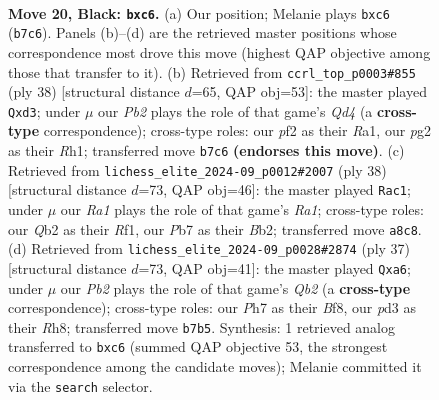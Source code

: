 \documentclass[11pt]{article}
\begin{document}
\clearpage

\begin{figure}[p]\centering
\begin{subfigure}{0.46\textwidth}\centering
\resizebox{\linewidth}{!}{%
\newchessgame
\chessboard[
  setfen={r6r/ppk2p1p/2N2N2/6Q1/3p4/3P4/bq3PPP/2R3K1 b - - 0 20},
  showmover=false,
  pgfstyle=straightmove, color=movearrow, markmove={b7-c6}
]}
\caption{}
\end{subfigure}\hfill
\begin{subfigure}{0.46\textwidth}\centering
\resizebox{\linewidth}{!}{%
\newchessgame
\chessboard[
  setfen={r3k3/pp3p2/6r1/1q5p/3Q3P/3nP3/PB2KPP1/R6R w q - 0 20},
  showmover=false,
  pgfstyle=straightmove, color=movearrow, markmove={d4-d3}
]}
\caption{}
\end{subfigure}
\\[4pt]
\begin{subfigure}{0.46\textwidth}\centering
\resizebox{\linewidth}{!}{%
\newchessgame
\chessboard[
  setfen={1rr5/p4ppp/4pk2/8/3q4/2n2P2/PBQ2P1P/R4RK1 w - - 4 20},
  showmover=false,
  pgfstyle=straightmove, color=movearrow, markmove={a1-c1}
]}
\caption{}
\end{subfigure}\hfill
\begin{subfigure}{0.46\textwidth}\centering
\resizebox{\linewidth}{!}{%
\newchessgame
\chessboard[
  setfen={2r1kb1r/1q3ppp/Rp2p3/4n3/4NQ2/1P6/1PP3PP/5RK1 b k - 1 19},
  showmover=false,
  pgfstyle=straightmove, color=movearrow, markmove={b7-a6}
]}
\caption{}
\end{subfigure}
\caption{\textbf{Move 20, Black: \texttt{bxc6}.} (a) Our position; Melanie plays \texttt{bxc6} (\texttt{b7c6}). Panels (b)--(d) are the retrieved master positions whose correspondence most drove this move (highest QAP objective among those that transfer to it). (b) Retrieved from \texttt{ccrl\_top\_p0003\#855} (ply 38) [structural distance $d$=65, QAP obj=53]: the master played \texttt{Qxd3}; under $\mu$ our \emph{Pb2} plays the role of that game's \emph{Qd4} (a \textbf{cross-type} correspondence); cross-type roles: our \emph{p}f2 as their \emph{R}a1, our \emph{p}g2 as their \emph{R}h1; transferred move \texttt{b7c6} \textbf{(endorses this move)}. (c) Retrieved from \texttt{lichess\_elite\_2024-09\_p0012\#2007} (ply 38) [structural distance $d$=73, QAP obj=46]: the master played \texttt{Rac1}; under $\mu$ our \emph{Ra1} plays the role of that game's \emph{Ra1}; cross-type roles: our \emph{Q}b2 as their \emph{R}f1, our \emph{P}b7 as their \emph{B}b2; transferred move \texttt{a8c8}. (d) Retrieved from \texttt{lichess\_elite\_2024-09\_p0028\#2874} (ply 37) [structural distance $d$=73, QAP obj=41]: the master played \texttt{Qxa6}; under $\mu$ our \emph{Pb2} plays the role of that game's \emph{Qb2} (a \textbf{cross-type} correspondence); cross-type roles: our \emph{P}h7 as their \emph{B}f8, our \emph{p}d3 as their \emph{R}h8; transferred move \texttt{b7b5}. Synthesis: 1 retrieved analog transferred to \texttt{bxc6} (summed QAP objective 53, the strongest correspondence among the candidate moves); Melanie committed it via the \texttt{search} selector.}
\label{fig:thought-m39}
\end{figure}
\end{document}
